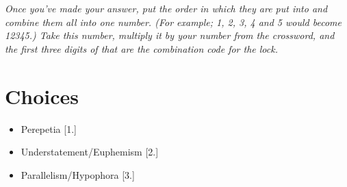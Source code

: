 \documentclass[11pt]{article}
\begin{document}
\newpage

\textit{Once you've made your answer, put the order in which they are put into and combine them all into one number. (For example; 1, 2, 3, 4 and 5 would become 12345.) Take this number, multiply it by your number from the crossword, and the first three digits of that are the combination code for the lock.}

\section*{Choices}

\begin{itemize}
  \item Perepetia [1.]
  \item Understatement/Euphemism [2.]
  \item Parallelism/Hypophora [3.]
\end{itemize}

\newpage
\end{document}
